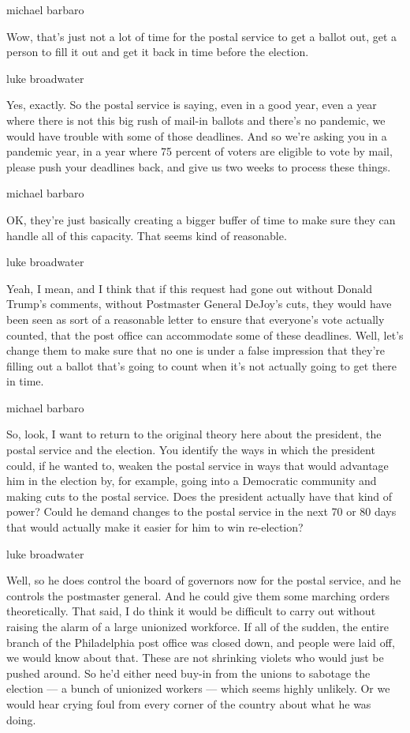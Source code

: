 michael barbaro

Wow, that's just not a lot of time for the postal service to get a
ballot out, get a person to fill it out and get it back in time before
the election.

luke broadwater

Yes, exactly. So the postal service is saying, even in a good year, even
a year where there is not this big rush of mail-in ballots and there's
no pandemic, we would have trouble with some of those deadlines. And so
we're asking you in a pandemic year, in a year where 75 percent of
voters are eligible to vote by mail, please push your deadlines back,
and give us two weeks to process these things.

michael barbaro

OK, they're just basically creating a bigger buffer of time to make sure
they can handle all of this capacity. That seems kind of reasonable.

luke broadwater

Yeah, I mean, and I think that if this request had gone out without
Donald Trump's comments, without Postmaster General DeJoy's cuts, they
would have been seen as sort of a reasonable letter to ensure that
everyone's vote actually counted, that the post office can accommodate
some of these deadlines. Well, let's change them to make sure that no
one is under a false impression that they're filling out a ballot that's
going to count when it's not actually going to get there in time.

michael barbaro

So, look, I want to return to the original theory here about the
president, the postal service and the election. You identify the ways in
which the president could, if he wanted to, weaken the postal service in
ways that would advantage him in the election by, for example, going
into a Democratic community and making cuts to the postal service. Does
the president actually have that kind of power? Could he demand changes
to the postal service in the next 70 or 80 days that would actually make
it easier for him to win re-election?

luke broadwater

Well, so he does control the board of governors now for the postal
service, and he controls the postmaster general. And he could give them
some marching orders theoretically. That said, I do think it would be
difficult to carry out without raising the alarm of a large unionized
workforce. If all of the sudden, the entire branch of the Philadelphia
post office was closed down, and people were laid off, we would know
about that. These are not shrinking violets who would just be pushed
around. So he'd either need buy-in from the unions to sabotage the
election --- a bunch of unionized workers --- which seems highly
unlikely. Or we would hear crying foul from every corner of the country
about what he was doing.

